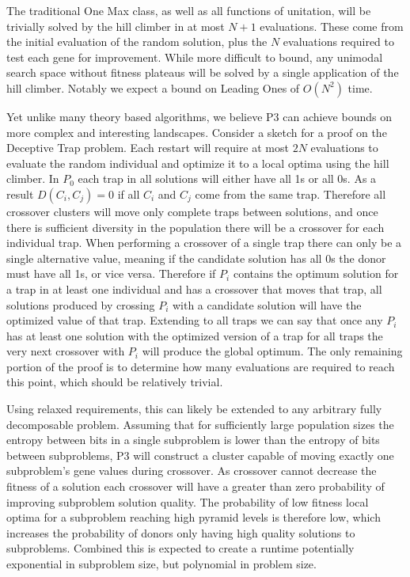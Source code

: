 \documentclass{sig-alternate}
\begin{document}
The traditional One Max class, as well as all functions of unitation, will be
trivially solved by the hill climber in at most $N+1$ evaluations.  These come
from the initial evaluation of the random solution, plus the $N$ evaluations required
to test each gene for improvement.  While more difficult to bound, any unimodal
search space without fitness plateaus will be solved by a single application
of the hill climber.  Notably we expect a bound on Leading Ones of $O(N^2)$ time.

Yet unlike many theory based algorithms, we believe P3 can achieve bounds on more
complex and interesting landscapes.  Consider a sketch for a proof on the Deceptive
Trap problem.  Each restart will require at most $2N$ evaluations to evaluate the
random individual and optimize it to a local optima using the hill climber.  In
$P_0$ each trap in all solutions will either have all 1s or all 0s.  As a result $D(C_i, C_j) = 0$
if all $C_i$ and $C_j$ come from the same trap.  Therefore all crossover clusters
will move only complete traps between solutions, and once there is sufficient
diversity in the population there will be a crossover for each individual trap.
When performing a crossover of a single trap there can only be a single alternative
value, meaning if the candidate solution has all 0s the donor must have all 1s, or vice
versa.  Therefore if $P_i$ contains the optimum solution for a trap in at least one
individual and has a crossover that moves that trap, all solutions produced by crossing
$P_i$ with a candidate solution will have the optimized value of that trap.  Extending to
all traps we can say that once any $P_i$ has at least one solution with the optimized
version of a trap for all traps the very next crossover with $P_i$ will produce the global optimum.
The only remaining portion of the proof is to determine how many evaluations are required to reach this point,
which should be relatively trivial.

Using relaxed requirements, this can likely be extended to any arbitrary fully decomposable
problem. Assuming that for sufficiently large population sizes the entropy between
bits in a single subproblem is lower than the entropy of bits between subproblems,
P3 will construct a cluster capable of moving exactly one subproblem's gene values
during crossover.  As crossover cannot decrease the fitness of a solution each
crossover will have a greater than zero probability of improving subproblem solution quality.
The probability of low fitness local optima for a subproblem reaching high pyramid levels
is therefore low, which increases the probability of donors only having high quality
solutions to subproblems.  Combined this is expected to create a runtime potentially
exponential in subproblem size, but polynomial in problem size.
\end{document}
